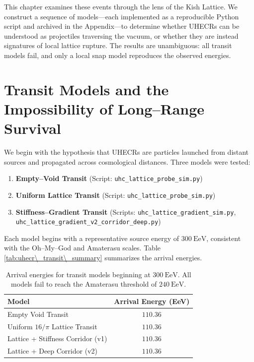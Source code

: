 \documentclass[11pt, letterpaper, openany]{book}
\begin{document}
This chapter examines these events through the lens of the Kish Lattice. We
construct a sequence of models---each implemented as a reproducible Python script
and archived in the Appendix---to determine whether UHECRs can be understood as
projectiles traversing the vacuum, or whether they are instead signatures of
local lattice rupture. The results are unambiguous: all transit models fail, and
only a local snap model reproduces the observed energies.

\section{Transit Models and the Impossibility of Long–Range Survival}

We begin with the hypothesis that UHECRs are particles launched from distant
sources and propagated across cosmological distances. Three models were tested:

\begin{enumerate}
    \item \textbf{Empty–Void Transit} (Script: \texttt{uhc\_lattice\_probe\_sim.py})
    \item \textbf{Uniform Lattice Transit} (Script: \texttt{uhc\_lattice\_probe\_sim.py})
    \item \textbf{Stiffness–Gradient Transit} (Scripts:
          \texttt{uhc\_lattice\_gradient\_sim.py},
          \texttt{uhc\_lattice\_gradient\_v2\_corridor\_deep.py})
\end{enumerate}

Each model begins with a representative source energy of $300~\mathrm{EeV}$,
consistent with the Oh–My–God and Amaterasu scales. Table
\ref{tab:uhecr\_transit\_summary} summarizes the arrival energies.

\begin{table}[H]
\centering
\begin{tabular}{|l|c|}
\hline
\textbf{Model} & \textbf{Arrival Energy (EeV)} \\ \hline
Empty Void Transit & $110.36$ \\ \hline
Uniform $16/\pi$ Lattice Transit & $110.36$ \\ \hline
Lattice + Stiffness Corridor (v1) & $110.36$ \\ \hline
Lattice + Deep Corridor (v2) & $110.36$ \\ \hline
\end{tabular}
\caption{Arrival energies for transit models beginning at $300~\mathrm{EeV}$.
All models fail to reach the Amaterasu threshold of $240~\mathrm{EeV}$.}
\label{tab:uhecr_transit_summary}
\end{table}
\end{document}
